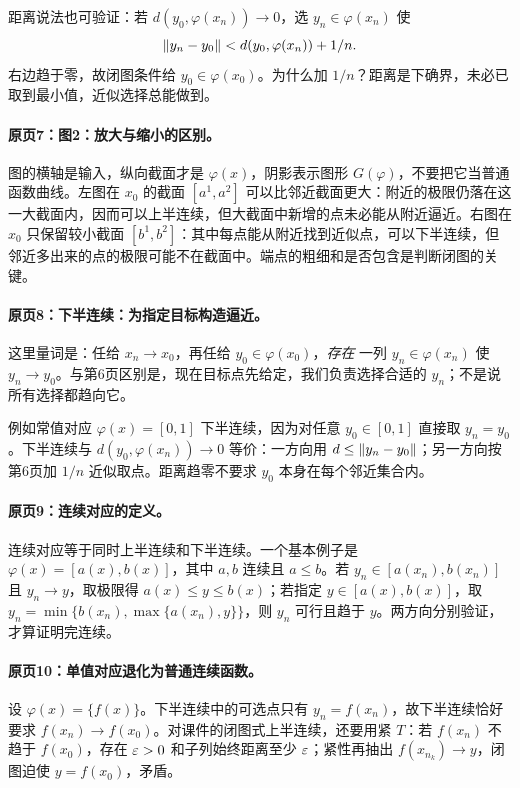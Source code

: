 距离说法也可验证：若 $d(y_0,\varphi(x_n))\to0$，选 $y_n\in\varphi(x_n)$ 使
\[\left\lVert y_n-y_0\right\rVert<d(y_0,\varphi(x_n))+1/n.\]
右边趋于零，故闭图条件给 $y_0\in\varphi(x_0)$。为什么加 $1/n$？距离是下确界，未必已取到最小值，近似选择总能做到。



\paragraph{原页7：图2：放大与缩小的区别。}图的横轴是输入，纵向截面才是 $\varphi(x)$，阴影表示图形 $G(\varphi)$，不要把它当普通函数曲线。左图在 $x_0$ 的截面 $[a^1,a^2]$ 可以比邻近截面更大：附近的极限仍落在这一大截面内，因而可以上半连续，但大截面中新增的点未必能从附近逼近。右图在 $x_0$ 只保留较小截面 $[b^1,b^2]$：其中每点能从附近找到近似点，可以下半连续，但邻近多出来的点的极限可能不在截面中。端点的粗细和是否包含是判断闭图的关键。



\paragraph{原页8：下半连续：为指定目标构造逼近。}这里量词是：任给 $x_n\to x_0$，再任给 $y_0\in\varphi(x_0)$，\emph{存在} 一列 $y_n\in\varphi(x_n)$ 使 $y_n\to y_0$。与第6页区别是，现在目标点先给定，我们负责选择合适的 $y_n$；不是说所有选择都趋向它。

例如常值对应 $\varphi(x)=[0,1]$ 下半连续，因为对任意 $y_0\in[0,1]$ 直接取 $y_n=y_0$。下半连续与 $d(y_0,\varphi(x_n))\to0$ 等价：一方向用 $d\le\left\lVert y_n-y_0\right\rVert$；另一方向按第6页加 $1/n$ 近似取点。距离趋零不要求 $y_0$ 本身在每个邻近集合内。



\paragraph{原页9：连续对应的定义。}连续对应等于同时上半连续和下半连续。一个基本例子是 $\varphi(x)=[a(x),b(x)]$，其中 $a,b$ 连续且 $a\le b$。若 $y_n\in[a(x_n),b(x_n)]$ 且 $y_n\to y$，取极限得 $a(x)\le y\le b(x)$；若指定 $y\in[a(x),b(x)]$，取 $y_n=\min\{b(x_n),\max\{a(x_n),y\}\}$，则 $y_n$ 可行且趋于 $y$。两方向分别验证，才算证明完连续。



\paragraph{原页10：单值对应退化为普通连续函数。}设 $\varphi(x)=\{f(x)\}$。下半连续中的可选点只有 $y_n=f(x_n)$，故下半连续恰好要求 $f(x_n)\to f(x_0)$。对课件的闭图式上半连续，还要用紧 $T$：若 $f(x_n)$ 不趋于 $f(x_0)$，存在 $\varepsilon>0$ 和子列始终距离至少 $\varepsilon$；紧性再抽出 $f(x_{n_k})\to y$，闭图迫使 $y=f(x_0)$，矛盾。

